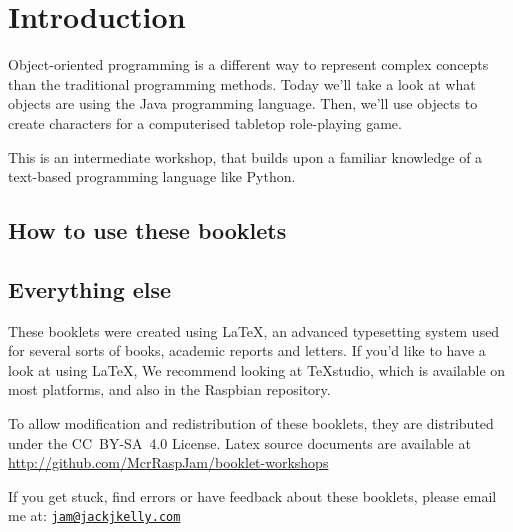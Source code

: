 \setcounter{section}{-1}
\section{Introduction}
	
	Object-oriented programming is a different way to represent complex concepts than the traditional programming methods.
	Today we'll take a look at what objects are using the Java programming language.	
	Then, we'll use objects to create characters for a computerised tabletop role-playing game.

	This is an intermediate workshop, that builds upon a familiar knowledge of a text-based programming language like Python.
		
	\subsection*{How to use these booklets}

	
	
	
	
	
	
	
	
	\subsection*{Everything else}
	
		These booklets were created using \textrm{\LaTeX}, an advanced typesetting system used for several sorts of books, academic reports and letters.
		\ifprint\else
			If you'd like to have a look at using LaTeX, We recommend looking at \TeX studio, which is available on most platforms, and also in the Raspbian repository.
		\fi
		
		
		To allow modification and redistribution of these booklets, they are distributed under the \hbox{CC BY-SA 4.0} License.
		Latex source documents are available at \url{http://github.com/McrRaspJam/booklet-workshops}
		
		If you get stuck, find errors or have feedback about these booklets, please email me at:
		\href{mailto:jam@jackjkelly.com}{\texttt{jam@jackjkelly.com}}